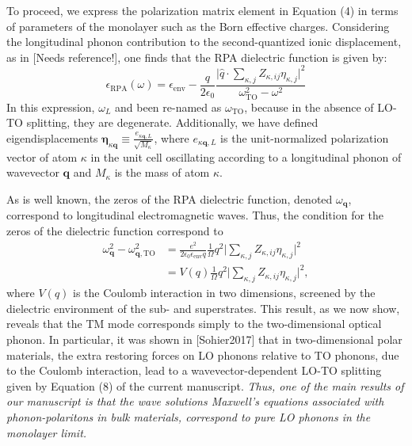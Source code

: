 \documentclass[aps,prb,twocolumn,
	groupedaddress,superscriptaddress,
	amsfonts,amssymb,amsmath,floatfix,
	citeautoscript]{revtex4-1}
\begin{document}
To proceed, we express the polarization matrix element in Equation (4) in terms of parameters of the monolayer such as the Born effective charges. Considering the longitudinal phonon contribution to the second-quantized ionic displacement, as in [Needs reference!], one finds that the RPA dielectric function is given by:
\begin{equation}
\epsilon_{\mathrm{RPA}}(\omega) = \epsilon_{\mathrm{env}} - \frac{q}{2\epsilon_0}\frac{\Big|\hat{q}\cdot\sum\limits_{\kappa,j} Z_{\kappa,ij}\eta_{\kappa,j}  \Big|^2}{\omega^2_{\mathrm{TO}}-\omega^2}
\end{equation}
In this expression, $\omega_L$ and been re-named as $\omega_{\mathrm{TO}}$, because in the absence of LO-TO splitting, they are degenerate. Additionally, we have defined eigendisplacements $\boldsymbol{\eta}_{\kappa\mathbf{q}}\equiv \frac{e_{\kappa\mathbf{q},L}}{\sqrt{M_{\kappa}}}$, where $e_{\kappa\mathbf{q},L}$ is the unit-normalized polarization vector of atom $\kappa$ in the unit cell oscillating according to a longitudinal phonon of wavevector $\mathbf{q}$ and $M_{\kappa}$ is the mass of atom $\kappa$.

As is well known, the zeros of the RPA dielectric function, denoted $\omega_{\mathbf{q}}$, correspond to longitudinal electromagnetic waves. Thus, the condition for the zeros of the dielectric function correspond to
\begin{align}
\omega^2_{\mathbf{q}} - \omega^2_{\mathbf{q},\mathrm{TO}} &= \frac{e^2}{2\epsilon_0\epsilon_{\mathrm{env}}q}\frac{1}{\Omega}q^2\Big|\sum\limits_{\kappa,j}Z_{\kappa,ij}\eta_{\kappa,j}  \Big|^2 \nonumber \\
&= V(q)\frac{1}{\Omega}q^2\Big|\sum\limits_{\kappa,j}Z_{\kappa,ij}\eta_{\kappa,j}  \Big|^2,
\end{align}
where $V(q)$ is the Coulomb interaction in two dimensions, screened by the dielectric environment of the sub- and superstrates. This result, as we now show, reveals that the TM mode corresponds simply to the two-dimensional optical phonon. In particular, it was shown in [Sohier2017] that in two-dimensional polar materials, the extra restoring forces on LO phonons relative to TO phonons, due to the Coulomb interaction, lead to a wavevector-dependent LO-TO splitting given by Equation (8) of the current manuscript. \textit{Thus, one of the main results of our manuscript is that the wave solutions Maxwell's equations associated with phonon-polaritons in bulk materials, correspond to pure LO phonons in the monolayer limit.} 
\end{document}
